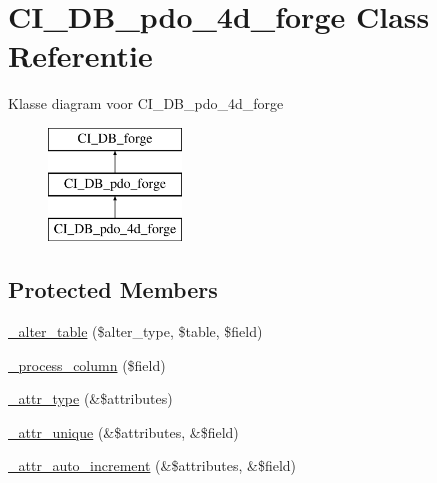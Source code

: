 \hypertarget{class_c_i___d_b__pdo__4d__forge}{}\section{C\+I\+\_\+\+D\+B\+\_\+pdo\+\_\+4d\+\_\+forge Class Referentie}
\label{class_c_i___d_b__pdo__4d__forge}
Klasse diagram voor C\+I\+\_\+\+D\+B\+\_\+pdo\+\_\+4d\+\_\+forge\begin{figure}[H]
\begin{center}
\leavevmode
\includegraphics[height=3.000000cm]{class_c_i___d_b__pdo__4d__forge}
\end{center}
\end{figure}
\subsection*{Protected Members}
\begin{DoxyCompactItemize}
\item 
\mbox{\hyperlink{class_c_i___d_b__pdo__4d__forge_a41c6cae02f2fda8b429ad0afb9509426}{\+\_\+alter\+\_\+table}} (\$alter\+\_\+type, \$table, \$field)
\item 
\mbox{\hyperlink{class_c_i___d_b__pdo__4d__forge_a8f38f1c5b5dddecca4befbe393f3f299}{\+\_\+process\+\_\+column}} (\$field)
\item 
\mbox{\hyperlink{class_c_i___d_b__pdo__4d__forge_a8553be952084c6f7cdfff370a1d14f6b}{\+\_\+attr\+\_\+type}} (\&\$attributes)
\item 
\mbox{\hyperlink{class_c_i___d_b__pdo__4d__forge_a7568a93ea53a7392a63fffe83bb7a090}{\+\_\+attr\+\_\+unique}} (\&\$attributes, \&\$field)
\item 
\mbox{\hyperlink{class_c_i___d_b__pdo__4d__forge_a2a013a5932439c3c44f0dad3436525f7}{\+\_\+attr\+\_\+auto\+\_\+increment}} (\&\$attributes, \&\$field)
\end{DoxyCompactItemize}
